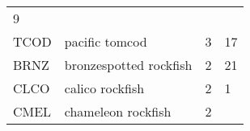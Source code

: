 \documentclass[]{article}
\begin{document}
\begin{longtable}[c]{@{}llll@{}}
\begin{minipage}[t]{0.23\columnwidth}
9
\end{minipage}
\\\addlinespace
\begin{minipage}[t]{0.08\columnwidth}\raggedright
TCOD
\end{minipage} & \begin{minipage}[t]{0.36\columnwidth}\raggedright
pacific tomcod
\end{minipage} & \begin{minipage}[t]{0.21\columnwidth}\raggedright
3
\end{minipage} & \begin{minipage}[t]{0.23\columnwidth}\raggedright
17
\end{minipage}
\\\addlinespace
\begin{minipage}[t]{0.08\columnwidth}\raggedright
BRNZ
\end{minipage} & \begin{minipage}[t]{0.36\columnwidth}\raggedright
bronzespotted rockfish
\end{minipage} & \begin{minipage}[t]{0.21\columnwidth}\raggedright
2
\end{minipage} & \begin{minipage}[t]{0.23\columnwidth}\raggedright
21
\end{minipage}
\\\addlinespace
\begin{minipage}[t]{0.08\columnwidth}\raggedright
CLCO
\end{minipage} & \begin{minipage}[t]{0.36\columnwidth}\raggedright
calico rockfish
\end{minipage} & \begin{minipage}[t]{0.21\columnwidth}\raggedright
2
\end{minipage} & \begin{minipage}[t]{0.23\columnwidth}\raggedright
1
\end{minipage}
\\\addlinespace
\begin{minipage}[t]{0.08\columnwidth}\raggedright
CMEL
\end{minipage} & \begin{minipage}[t]{0.36\columnwidth}\raggedright
chameleon rockfish
\end{minipage} & \begin{minipage}[t]{0.21\columnwidth}\raggedright
2
\end{minipage} & \begin{minipage}[t]{0.23\columnwidth}\raggedright

\end{minipage}
\end{longtable}
\end{document}
